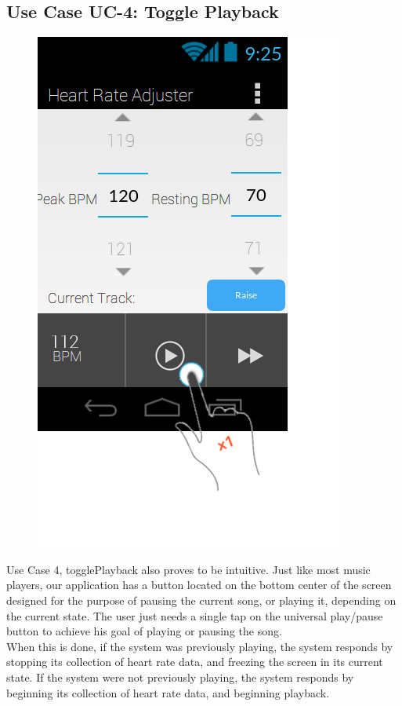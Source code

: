\documentclass[letterpaper,english, 12pt]{scrreprt}
\begin{document}
\subsection{Use Case UC-4: Toggle Playback}

\begin{figure}[H]
	\centering
	\includegraphics{img/Prelim_Design/PrelimDesign_3.png}\\
\end{figure}

Use Case 4, togglePlayback also proves to be intuitive. Just like most music players, our application has a button located on the bottom center of the screen designed for the purpose of pausing the current song, or playing it, depending on the current state. The user just needs a single tap on the universal play/pause button to achieve his goal of playing or pausing the song.\\

When this is done, if the system was previously playing, the system responds by stopping its collection of heart rate data, and freezing the screen in its current state. 
If the system were not previously playing, the system responds by beginning its collection of heart rate data, and beginning playback.
\end{document}
